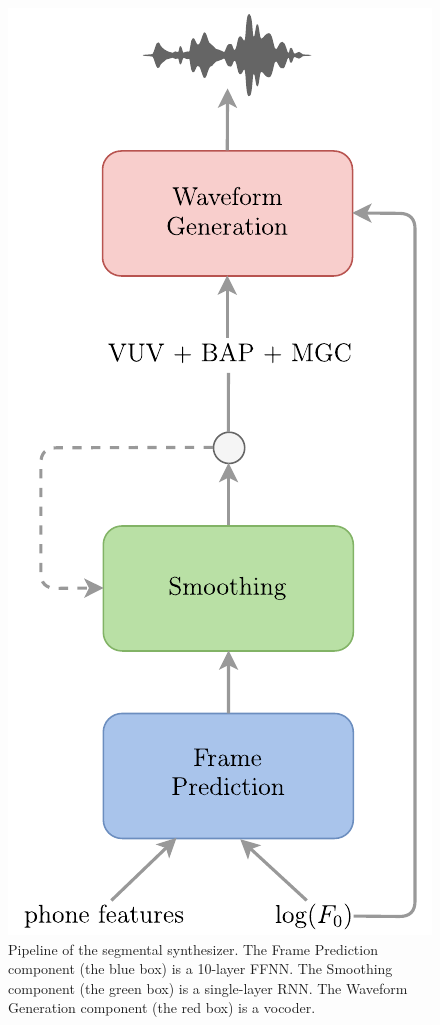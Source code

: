 \begin{figure}[h]
    \centering
    \includegraphics[scale=0.8]{figures/seg-pipeline.pdf}
    \vspace*{5mm}
    \caption[Segmental synthesizer pipeline]{Pipeline of the segmental synthesizer. The Frame Prediction component (the blue box) is a 10-layer \ac{FFNN}. The Smoothing component (the green box) is a single-layer \ac{RNN}. The Waveform Generation component (the red box) is a vocoder.}
    \label{fig:seg-pipeline}
\end{figure}

